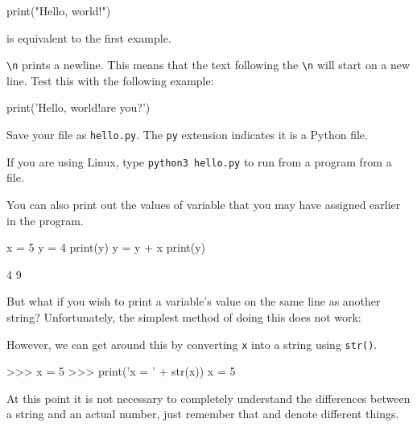 \documentclass[11pt]{cselabheader}
\begin{document}
\begin{python3code}
print("Hello, world!")
\end{python3code}

is equivalent to the first example.

\texttt{\textbackslash n} prints a newline. This means that the text following
the \texttt{\textbackslash n} will start on a new line. Test this with the
following example:

\begin{python3code}
print('Hello, world!\nHow are you?')
\end{python3code}

Save your file as \texttt{hello.py}. The \texttt{py} extension indicates it is a
Python file.

If you are using Linux, type \texttt{python3 hello.py} to run from a program
from a file.


You can also print out the values of variable that you may have assigned earlier
in the program.

\begin{python3code}
x = 5
y = 4
print(y)
y = y + x
print(y)
\end{python3code}

\begin{verbatimcode}
4
9
\end{verbatimcode}

But what if you wish to print a variable's value on the same line as another
string? Unfortunately, the simplest method of doing this does not work:


However, we can get around this by converting \texttt{x} into a string using
\texttt{str()}.

\begin{pyconcode}
>>> x = 5
>>> print('x = ' + str(x))
x = 5
\end{pyconcode}

At this point it is not necessary to completely understand the differences
between a string and an actual number, just remember that 
and  denote different things.
\end{document}
